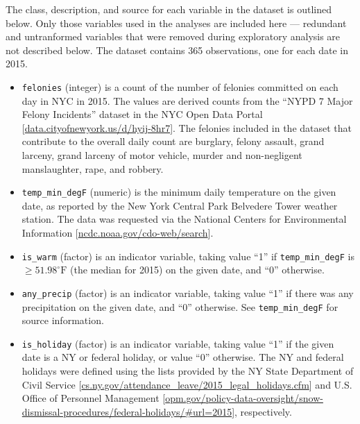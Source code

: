 \documentclass[11pt,notitlepage]{article}
\newcommand{\degf}{^\circ\text{F}}
\begin{document}
The class, description, and source for each variable in the dataset is outlined below. Only those variables used in the analyses are included here --- redundant and untranformed variables that were removed during exploratory analysis are not described below. The dataset contains 365 observations, one for each date in 2015.

\begin{itemize}
\setlength\itemsep{-1pt}

\item \texttt{felonies} (integer) is a count of the number of felonies committed on each day in NYC in 2015. The values are derived counts from the ``NYPD 7 Major Felony Incidents'' dataset in the NYC Open Data Portal [\href{https://data.cityofnewyork.us/Public-Safety/NYPD-7-Major-Felony-Incidents/hyij-8hr7}{data.cityofnewyork.us/d/hyij-8hr7}]. The felonies included in the dataset that contribute to the overall daily count are burglary, felony assault, grand larceny, grand larceny of motor vehicle, murder and non-negligent manslaughter, rape, and robbery.

\item \texttt{temp_min_degF} (numeric) is the minimum daily temperature on the given date, as reported by the New York Central Park Belvedere Tower weather station. The data was requested via the National Centers for Environmental Information [\href{http://www.ncdc.noaa.gov/cdo-web/search}{ncdc.noaa.gov/cdo-web/search}].

\item \texttt{is_warm} (factor) is an indicator variable, taking value ``1'' if \texttt{temp_min_degF} is $\geq 51.98 \degf$ (the median for 2015) on the given date, and ``0'' otherwise.

\item \texttt{any_precip} (factor) is an indicator variable, taking value ``1'' if there was any precipitation on the given date, and ``0'' otherwise. See \texttt{temp_min_degF} for source information.


\item \texttt{is_holiday} (factor) is an indicator variable, taking value ``1'' if the given date is a NY or federal holiday, or value ``0'' otherwise. The NY and federal holidays were defined using the lists provided by the NY State Department of Civil Service [\href{https://www.cs.ny.gov/attendance_leave/2015_legal_holidays.cfm}{cs.ny.gov/attendance_leave/2015_legal_holidays.cfm}] and U.S. Office of Personnel Management [\href{https://www.opm.gov/policy-data-oversight/snow-dismissal-procedures/federal-holidays/\#url=2015}{opm.gov/policy-data-oversight/snow-dismissal-procedures/federal-holidays/\#url=2015}], respectively.



\end{itemize}
\end{document}
